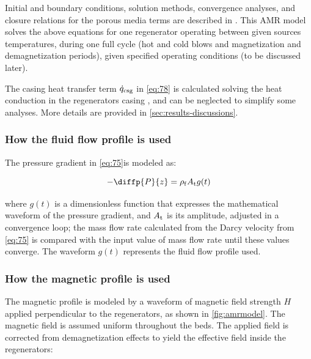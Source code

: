 \documentclass[draft]{svjour3}
\begin{document}
Initial and boundary conditions, solution methods, convergence analyses, and closure relations for the porous media terms are described in \cite{bib:trevizoli16_perfor_model}. This AMR model solves the above equations for one regenerator operating between given sources temperatures, during one full cycle (hot and cold blows and  magnetization and demagnetization periods), given specified operating conditions (to be discussed later).

The casing heat transfer term $\dot{q}_{\mathrm{csg}}$ in \autoref{eq:78} is calculated solving the heat conduction in the regenerators casing \cite{bib:trevizoli16_perfor_model}, and can be neglected to simplify some analyses. More details are provided in \autoref{sec:results-discussions}.

\subsubsection{How the fluid flow profile is used}
\label{sec:how-fluid-flow}

The pressure gradient in \autoref{eq:75}is modeled as:

\begin{equation}
\label{eq:76}
-\diffp{P}{z} = \rho\ped{f} A\ped{t} g(t)
\end{equation}

\noindent where \(g(t)\) is a dimensionless function that expresses the mathematical waveform of the pressure gradient, and  \(A_{\mathrm{t}}\) is its amplitude,  adjusted in a convergence loop; the mass flow rate calculated from the Darcy velocity from \autoref{eq:75} is compared with the input value of mass flow rate until these values converge. The waveform $g(t)$ represents the fluid flow profile used.



\subsubsection{How the magnetic profile is used}
\label{sec:how-magnetic-profile}


The magnetic profile is modeled by a waveform of magnetic field strength $H$ applied perpendicular to the regenerators, as shown in \autoref{fig:amrmodel}. The magnetic field is assumed uniform throughout the beds. The applied field is corrected from demagnetization effects to yield the effective field inside the regenerators:
\end{document}

